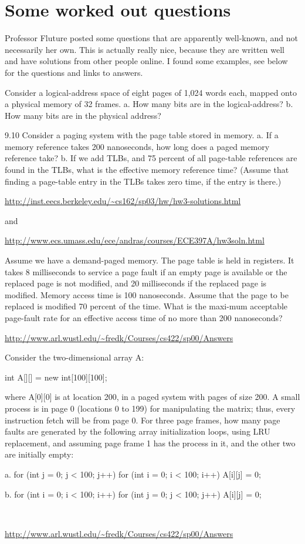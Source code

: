 \documentclass{article}
\newenvironment{code}{\framed  \verbatimtab  }{ \noindent \\[-1cm]\endverbatimtab \endframed }
\begin{document}
\section{Some worked out questions}
Professor Fluture posted some questions that are apparently well-known, and not necessarily her own. This is actually really nice, because they are written well and have solutions from other people online. I found some examples, see below for the questions and links to answers. 



\begin{code}
9.8	Consider a logical-address space of eight pages of 1,024 words each, 
mapped onto a physical memory of 32 frames.
a.	How many bits are in the logical-address?	
b.	How many bits are in the physical address?

9.10	Consider a paging system with the page table stored in memory.
a.	If a memory reference takes 200 nanoseconds, how long does a paged memory 
reference take?
b.	If we add TLBs, and 75 percent of all page-table references are found in the
TLBs, what is the effective memory reference time? (Assume that finding a 
page-table entry in  the TLBs takes zero time, if the entry is there.)
\end{code}

\url{http://inst.eecs.berkeley.edu/~cs162/sp03/hw/hw3-solutions.html}

and 

\url{http://www.ecs.umass.edu/ece/andras/courses/ECE397A/hw3soln.html}

\begin{code}
Assume we have a demand-paged memory. The page table is held
in registers. It takes 8 milliseconds to service a page fault if an
empty page is available or the replaced page is not modified, and 20
milliseconds if the replaced page is modified. Memory access time is
100 nanoseconds.  Assume that the page to be replaced is modified 70
percent of the time.  What is the maxi-mum acceptable page-fault rate
for an effective access time of no more than 200 nanoseconds?
\end{code}

\url{http://www.arl.wustl.edu/~fredk/Courses/cs422/sp00/Answers}


\begin{code}
Consider the two-dimensional array A: 

int A[][] = new int[100][100];

where A[0][0] is at location 200, in a paged system with pages of
size 200.  A small process is in page 0 (locations 0 to 199) for
manipulating the matrix; thus, every instruction fetch will be from
page 0. For three page frames, how many page faults are generated
by the following array initialization loops, using LRU replacement,
and assuming page frame 1 has the process in it, and the other two are
initially empty: 

  a. for (int j = 0; j < 100; j++) 
       for (int i = 0; i < 100; i++) 
         A[i][j] = 0; 

  b. for (int i = 0; i < 100; i++) 
       for (int j = 0; j < 100; j++) 
         A[i][j] = 0; 

\end{code}

\url{http://www.arl.wustl.edu/~fredk/Courses/cs422/sp00/Answers}
\end{document}
